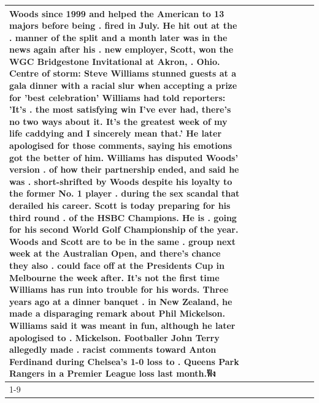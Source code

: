 \begin{table}[H]
\begin{tabular}{lllrlllll}
Woods since 1999 and helped the American to 13 majors before being . fired in July. He hit out at the . manner of the split and a month later was in the news again after his . new employer, Scott, won the WGC Bridgestone Invitational at Akron, . Ohio. Centre of storm: Steve Williams stunned guests at a gala dinner with a racial slur when accepting a prize for 'best celebration' Williams had told reporters: 'It's . the most satisfying win I've ever had, there's no two ways about it. It's the greatest week of my life caddying and I sincerely mean that.' He later apologised for those comments, saying his emotions got the better of him. Williams has disputed Woods' version . of how their partnership ended, and said he was . short-shrifted by Woods despite his loyalty to the former No. 1 player . during the sex scandal that derailed his career. Scott is today preparing for his third round . of the HSBC Champions. He is . going for his second World Golf Championship of the year. Woods and Scott are to be in the same . group next week at the Australian Open, and there's chance they also . could face off at the Presidents Cup in Melbourne the week after. It's not the first time Williams has run into trouble for his words. Three years ago at a dinner banquet . in New Zealand, he made a disparaging remark about Phil Mickelson. Williams said it was meant in fun, although he later apologised to . Mickelson. Footballer John Terry allegedly made . racist comments toward Anton Ferdinand during Chelsea's 1-0 loss to . Queens Park Rangers in a Premier League loss last month.ฟัง \\
\cline{1-9}

\end{tabular}
\end{table}
